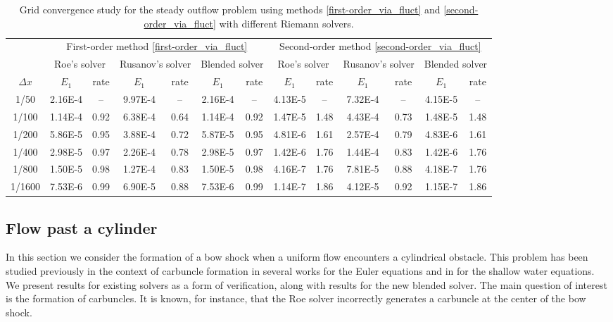 \documentclass[preprint, 11pt]{article}
\begin{document}
\begin{table}[!ht]\scriptsize
  \begin{center}
    \begin{tabular}{||c||c|c||c|c||c|c||c|c||c|c||c|c||} \hline
      & \multicolumn{6}{c||}{First-order method \eqref{first-order_via_fluct}}
      & \multicolumn{6}{c||}{Second-order method \eqref{second-order_via_fluct}} \\ \cline{2-13}
      & \multicolumn{2}{c||}{Roe's solver}
      &\multicolumn{2}{c||}{Rusanov's solver}
      &\multicolumn{2}{c||}{Blended solver}
      & \multicolumn{2}{c||}{Roe's solver}
      &\multicolumn{2}{c||}{Rusanov's solver}
      &\multicolumn{2}{c||}{Blended solver}
      \\ \cline{2-13}
      $\Delta x$ & $E_1$ & rate & $E_1$ & rate & $E_1$ & rate & $E_1$ & rate & $E_1$ & rate & $E_1$ & rate\\ \hline
      1/50   & 2.16E-4 &  --  & 9.97E-4 &   -- & 2.16E-4 & --   & 4.13E-5 &   -- & 7.32E-4 &  --  & 4.15E-5 & --   \\
      1/100  & 1.14E-4 & 0.92 & 6.38E-4 & 0.64 & 1.14E-4 & 0.92 & 1.47E-5 & 1.48 & 4.43E-4 & 0.73 & 1.48E-5 & 1.48 \\
      1/200  & 5.86E-5 & 0.95 & 3.88E-4 & 0.72 & 5.87E-5 & 0.95 & 4.81E-6 & 1.61 & 2.57E-4 & 0.79 & 4.83E-6 & 1.61 \\
      1/400  & 2.98E-5 & 0.97 & 2.26E-4 & 0.78 & 2.98E-5 & 0.97 & 1.42E-6 & 1.76 & 1.44E-4 & 0.83 & 1.42E-6 & 1.76 \\
      1/800  & 1.50E-5 & 0.98 & 1.27E-4 & 0.83 & 1.50E-5 & 0.98 & 4.16E-7 & 1.76 & 7.81E-5 & 0.88 & 4.18E-7 & 1.76 \\
      1/1600 & 7.53E-6 & 0.99 & 6.90E-5 & 0.88 & 7.53E-6 & 0.99 & 1.14E-7 & 1.86 & 4.12E-5 & 0.92 & 1.15E-7 & 1.86 \\ \hline
    \end{tabular}
    \caption{Grid convergence study for the steady outflow problem
      using methods \eqref{first-order_via_fluct} and \eqref{second-order_via_fluct}
      with different Riemann solvers.\label{table:steady_outflow}}
  \end{center}
\end{table}

\subsection{Flow past a cylinder}\label{sec:bow_shock}
In this section we consider the formation of a bow shock when a
uniform flow encounters a cylindrical obstacle.  This problem has
been studied previously in the context of carbuncle formation in
several works for the Euler equations and in
\cite{kemm2014note,bader2014carbuncle} for the shallow water equations.
We present results for existing solvers as a form of verification,
along with results for the new blended solver.  The main question of
interest is the formation of carbuncles.  It is known, for instance,
that the Roe solver incorrectly generates a carbuncle at the center
of the bow shock.
\end{document}
